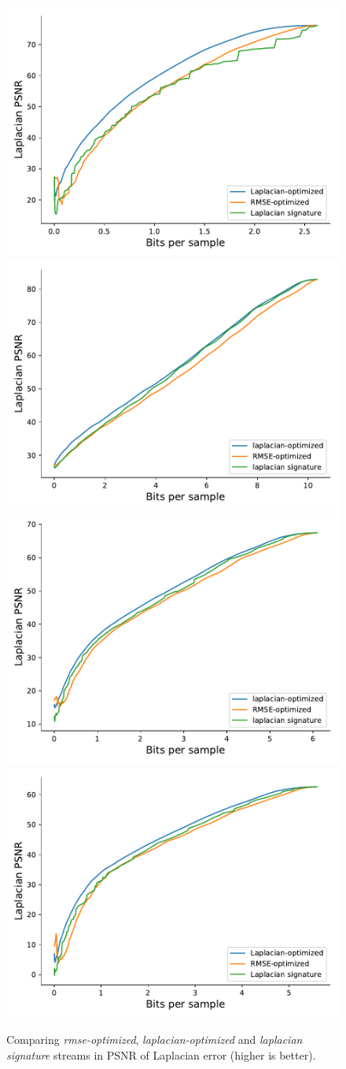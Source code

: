 \begin{figure}
	\centering
	{\includegraphics[width=0.48\linewidth]{img/gradient-laplacian/euler-laplacian.pdf}}
	{\includegraphics[width=0.48\linewidth]{img/gradient-laplacian/magnetic-laplacian.pdf}}
	{\includegraphics[width=0.48\linewidth]{img/gradient-laplacian/miranda-diffusivity-laplacian.pdf}}
	{\includegraphics[width=0.48\linewidth]{img/gradient-laplacian/miranda-velocityz-laplacian.pdf}}
	\caption{Comparing \emph{rmse-optimized}, \emph{laplacian-optimized} and \emph{laplacian
	signature} streams in PSNR of Laplacian error (higher is better).}
	\label{fig:laplacian-comparison}
\end{figure}

